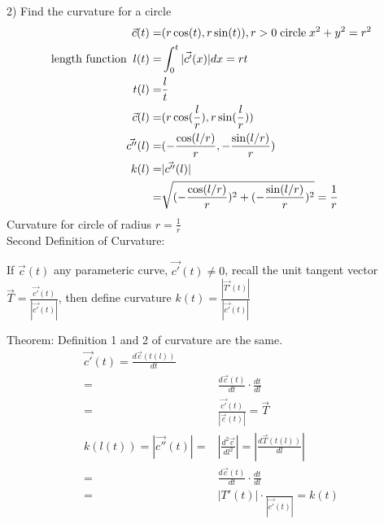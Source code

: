 \documentclass{article}
\begin{document}
        2) Find the curvature for a circle
        \begin{align}
            \vec{c}(t) =& (r\cos(t),r\sin(t)), r>0 \text{\;circle\;} x^2 + y^2 = r^2\\
            \text{length function\;\;}l(t) =& \int^{t}_{0} |\vec{c'}(x)|dx = rt\\
            t(l) =& \frac{l}{t}\\
            \vec{c}(l) =& (r\cos(\frac{l}{r}),r\sin(\frac{l}{r}))\\
            \vec{c''}(l) =& (-\frac{\cos(l/r)}{r},-\frac{\sin(l/r)}{r})\\
            k(l) =& |\vec{c''}(l)|\\
            =& \sqrt{(-\frac{\cos(l/r)}{r})^2+(-\frac{\sin(l/r)}{r})^2} = \frac{1}{r}
        \end{align}
        Curvature for circle of radius $r =\frac{1}{r}$\\
        
        Second Definition of Curvature:
        
        If $\vec{c}(t)$ any parameteric curve, $\vec{c'}(t)\neq0$, recall the unit tangent vector $\vec{T} = \frac{\vec{c'}(t)}{|\vec{c'}(t)|}$, then define curvature $k(t)=\frac{|\vec{T'}(t)|}{|\vec{c'}(t)|}$
        
        Theorem: Definition 1 and 2 of curvature are the same.
        \begin{align}
            \vec{c'}(t) = \frac{d\vec{c}(t(l))}{dt}\\
            =&\frac{d\vec{c}(t)}{dt}\cdot\frac{dt}{dl}\\
            =&\frac{\vec{c'}(t)}{|\vec{c}(t)|} = \vec{T}\\
            k(l(t)) = |\vec{c''}(t)| =& |\frac{d^2\vec{c}}{dl^2}| = |\frac{d\vec{T}(t(l))}{dl}|\\
            =&\frac{d\vec{c}(t)}{dt}\cdot\frac{dt}{dl}\\
            =&|T'(t)|\cdot\frac{}{|\vec{c'}(t)|} = k(t)
        \end{align}
\end{document}
